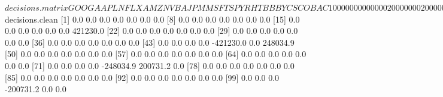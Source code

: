 \documentclass{article}
\begin{document}
\begin{Schunk}
\begin{Soutput}
$decisions.matrix
  GOOG AAPL NFLX AMZN V BA JPM MSFT SPY RHT BBBY CSCO BAC
1    0    0    0    0 0  0   0    0   0   0    0    0   0
2    0    0    0    0 0  0   0    2   0   0    0    0   0
3    0    0    0    0 0  0   0    0   0   0    0    0   0
4    0    0    0    0 0  0   0   -2   0   2    0    0   0
5    0    0    0    0 0  0   0    0   0   0    0    0   0
6    0    0    0    0 0  0   0    0   0  -2    2    0   0
7    0    0    0    0 0  0   0    0   0   0    0    0   0
8    0    0    0    0 0  0   0    0   0   0   -2    0   0

$decisions.clean
  [1]       0.0       0.0       0.0       0.0       0.0       0.0       0.0
  [8]       0.0       0.0       0.0       0.0       0.0       0.0       0.0
 [15]       0.0       0.0       0.0       0.0       0.0       0.0  421230.0
 [22]       0.0       0.0       0.0       0.0       0.0       0.0       0.0
 [29]       0.0       0.0       0.0       0.0       0.0       0.0       0.0
 [36]       0.0       0.0       0.0       0.0       0.0       0.0       0.0
 [43]       0.0       0.0       0.0       0.0 -421230.0       0.0  248034.9
 [50]       0.0       0.0       0.0       0.0       0.0       0.0       0.0
 [57]       0.0       0.0       0.0       0.0       0.0       0.0       0.0
 [64]       0.0       0.0       0.0       0.0       0.0       0.0       0.0
 [71]       0.0       0.0       0.0       0.0 -248034.9  200731.2       0.0
 [78]       0.0       0.0       0.0       0.0       0.0       0.0       0.0
 [85]       0.0       0.0       0.0       0.0       0.0       0.0       0.0
 [92]       0.0       0.0       0.0       0.0       0.0       0.0       0.0
 [99]       0.0       0.0       0.0 -200731.2       0.0       0.0
\end{Soutput}
\end{Schunk}
\end{document}
